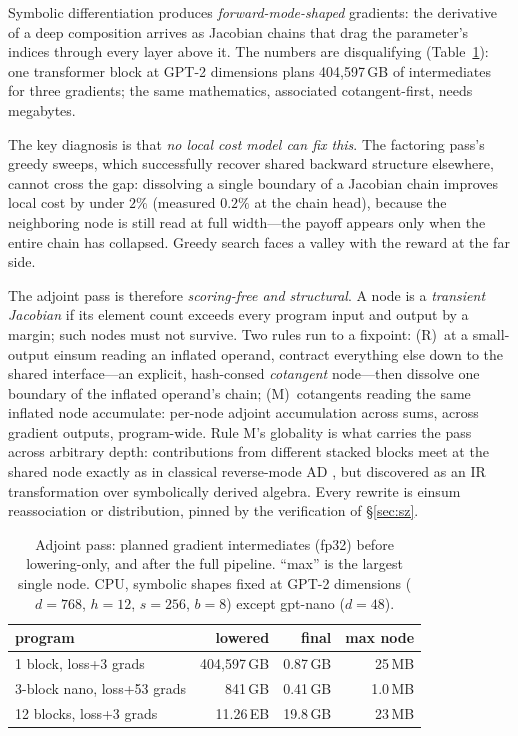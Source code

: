 \documentclass[sigplan,10pt,review]{acmart}
\begin{document}
Symbolic differentiation produces \emph{forward-mode-shaped} gradients:
the derivative of a deep composition arrives as Jacobian chains that drag
the parameter's indices through every layer above it. The numbers are
disqualifying (Table~\ref{tab:adjoint}): one transformer block at GPT-2 \cite{gpt2}
dimensions plans 404{,}597\,GB of intermediates for three gradients; the
same mathematics, associated cotangent-first, needs megabytes.

The key diagnosis is that \emph{no local cost model can fix this}. The
factoring pass's greedy sweeps, which successfully recover shared
backward structure elsewhere, cannot cross the gap: dissolving a single
boundary of a Jacobian chain improves local cost by under $2\%$ (measured
$0.2\%$ at the chain head), because the neighboring node is still read at
full width---the payoff appears only when the entire chain has collapsed.
Greedy search faces a valley with the reward at the far side.

The adjoint pass is therefore \emph{scoring-free and structural}. A node
is a \emph{transient Jacobian} if its element count exceeds every program
input and output by a margin; such nodes must not survive. Two rules run
to a fixpoint: (R)~at a small-output einsum reading an inflated operand,
contract everything else down to the shared interface---an explicit,
hash-consed \emph{cotangent} node---then dissolve one boundary of the
inflated operand's chain; (M)~cotangents reading the same inflated node
accumulate: per-node adjoint accumulation across sums, across gradient
outputs, program-wide. Rule M's globality is what carries the pass across
arbitrary depth: contributions from different stacked blocks meet at the
shared node exactly as in classical reverse-mode AD \cite{griewank2008}, but discovered as an
IR transformation over symbolically derived algebra. Every rewrite is
einsum reassociation or distribution, pinned by the verification of
\S\ref{sec:sz}.

\begin{table}
\caption{Adjoint pass: planned gradient intermediates (fp32) before
lowering-only, and after the full pipeline. ``max'' is the largest single
node. CPU, symbolic shapes fixed at GPT-2 dimensions
($d{=}768$, $h{=}12$, $s{=}256$, $b{=}8$) except gpt-nano ($d{=}48$).}
\label{tab:adjoint}
\small
\begin{tabular}{lrrr}
\toprule
program & lowered & final & max node \\
\midrule
1 block, loss+3 grads & 404{,}597\,GB & 0.87\,GB & 25\,MB \\
3-block nano, loss+53 grads & 841\,GB & 0.41\,GB & 1.0\,MB \\
12 blocks, loss+3 grads & 11.26\,EB & 19.8\,GB & 23\,MB \\
\bottomrule
\end{tabular}
\end{table}
\end{document}
